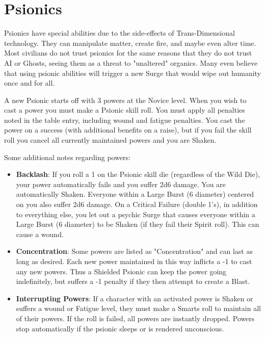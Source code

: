 
\section{Psionics}
\label{sec:psionics}

\begin{multicols}{2}

Psionics have special abilities due to the side-effects of Trans-Dimensional technology. They can manipulate matter, create fire, and maybe even alter time. Most civilians do not trust psionics for the same reasons that they do not trust AI or Ghosts, seeing them as a threat to "unaltered" organics. Many even believe that using psionic abilities will trigger a new Surge that would wipe out humanity once and for all.

A new Psionic starts off with 3 powers at the Novice level. When you wish to cast a power you must make a Psionic skill roll. You must apply all penalties noted in the table entry, including wound and fatigue penalties. You cast the power on a success (with additional benefits on a raise), but if you fail the skill roll you cancel all currently maintained powers and you are Shaken.

Some additional notes regarding powers:

\begin{itemize}

  \item \textbf{Backlash}: If you roll a 1 on the Psionic skill die (regardless of the Wild Die), your power automatically fails and you suffer 2d6 damage. You are automatically Shaken. Everyone within a Large Burst (6 diameter) centered on you also suffer 2d6 damage. On a Critical Failure (double 1's), in addition to everything else, you let out a psychic Surge that causes everyone within a Large Burst (6 diameter) to be Shaken (if they fail their Spirit roll). This can cause a wound.

  \item \textbf{Concentration}: Some powers are listed as "Concentration" and can last as long as desired. Each new power maintained in this way inflicts a -1 to cast any new powers. Thus a Shielded Psionic can keep the power going indefinitely, but suffers a -1 penalty if they then attempt to create a Blast.

  \item \textbf{Interrupting Powers}: If a character with an activated power is Shaken or suffers a wound or Fatigue level, they must make a Smarts roll to maintain all of their powers. If the roll is failed, all powers are instantly dropped. Powers stop automatically if the psionic sleeps or is rendered unconscious.


\end{itemize}
\end{multicols}
